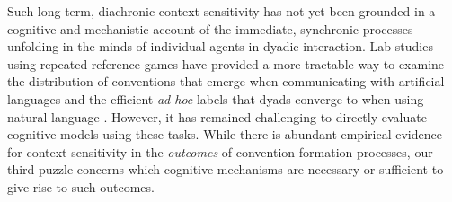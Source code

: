 Such long-term, diachronic context-sensitivity has not yet been grounded in a cognitive and mechanistic account of the immediate, synchronic processes unfolding in the minds of individual agents in dyadic interaction.
Lab studies using repeated reference games have provided a more tractable way to examine the distribution of conventions that emerge when communicating with artificial languages \cite{WintersKirbySmith14_LanguagesAdapt, KirbyTamarizCornishSmith15_CompressionCommunication,winters2018contextual} and the efficient \emph{ad hoc} labels that dyads converge to when using natural language \cite{hawkins2020characterizing}.
However, it has remained challenging to directly evaluate cognitive models using these tasks.
While there is abundant empirical evidence for context-sensitivity in the \emph{outcomes} of convention formation processes, our third puzzle concerns which cognitive mechanisms are necessary or sufficient to give rise to such outcomes.


